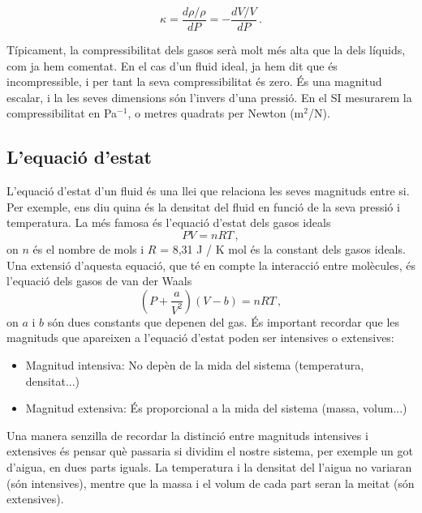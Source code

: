 \documentclass[12pt]{book}
\begin{document}
\begin{equation}
    \kappa = \frac{d\rho/\rho}{dP} = - \frac{dV/V}{dP} \, .
\end{equation}

Típicament, la compressibilitat dels gasos serà molt més alta que la dels líquids, com ja hem comentat. En el cas d'un fluid ideal, ja hem dit que és incompressible, i per tant la seva compressibilitat és zero. És una magnitud escalar, i la les seves dimensions són l'invers d'una pressió. En el SI mesurarem la compressibilitat en Pa$^{-1}$, o metres quadrats per Newton (m$^2$/N).

\subsection{L'equació d'estat}

L'equació d'estat d'un fluid és una llei que relaciona les seves magnituds entre si. Per exemple, ens diu quina és la densitat del fluid en funció de la seva pressió i temperatura. La més famosa és l'equació d'estat dels gasos ideals
%
\begin{equation}
    P V = n R T\, ,
\end{equation}
%
on $n$ és el nombre de mols i $R$ = 8,31 J / K mol és la constant dels gasos ideals. Una extensió d'aquesta equació, que té en compte la interacció entre molècules, és l'equació dels gasos de van der Waals
%
\begin{equation}
    \left(P + \frac{a}{V^2}\right)\left(V - b\right) = nRT\, ,
\end{equation}
%
on $a$ i $b$ són dues constants que depenen del gas. És important recordar que les magnituds que apareixen a l'equació d'estat poden ser intensives o extensives:

\begin{itemize}
    \item Magnitud intensiva: No depèn de la mida del sistema (temperatura, densitat...)
    \item Magnitud extensiva: És proporcional a la mida del sistema (massa, volum...)
\end{itemize}

Una manera senzilla de recordar la distinció entre magnituds intensives i extensives és pensar què passaria si dividim el nostre sistema, per exemple un got d'aigua, en dues parts iguals. La temperatura i la densitat del l'aigua no variaran (són intensives), mentre que la massa i el volum de cada part seran la meitat (són extensives).
\end{document}

